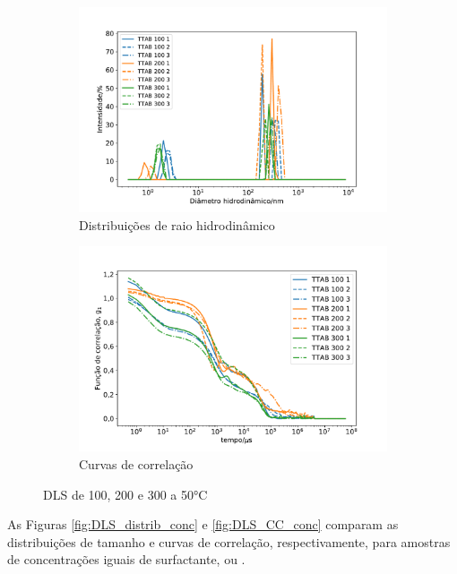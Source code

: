 \begin{figure}[h]
	\begin{subfigure}{0.47\textwidth}
		\centering
		\includegraphics[width=\textwidth]{imagens/dls/ttab_distrib}
		\caption{Distribuições de raio hidrodinâmico}
		\label{fig:DLS_ttab_distrib}
	\end{subfigure} \qquad %
	\begin{subfigure}{0.47\textwidth}
		\centering
		\includegraphics[width=\textwidth]{imagens/dls/ttab_CC}
		\caption{Curvas de correlação}
		\label{fig:DLS_ttab_cc}
	\end{subfigure}
	\caption{DLS de \TTAB{} 100, 200 e 300 \mM{} a 50°C}
	\label{fig:DLS_ttab}
\end{figure}

	As Figuras \ref{fig:DLS_distrib_conc} e \ref{fig:DLS_CC_conc} comparam as distribuições de tamanho e curvas de correlação, respectivamente, para amostras de concentrações iguais de surfactante, \CTAB{} ou \TTAB.

